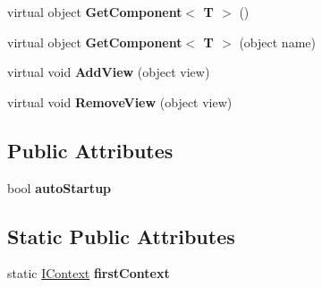 \begin{DoxyCompactItemize}
\item 
\hypertarget{classbabel_1_1extensions_1_1context_1_1impl_1_1_context_a949b909124a55e8e7b889cb94a343653}{virtual object {\bfseries Get\-Component$<$ T $>$} ()}\label{classbabel_1_1extensions_1_1context_1_1impl_1_1_context_a949b909124a55e8e7b889cb94a343653}

\item 
\hypertarget{classbabel_1_1extensions_1_1context_1_1impl_1_1_context_aad6ba901a97aade956c88030e1da2af3}{virtual object {\bfseries Get\-Component$<$ T $>$} (object name)}\label{classbabel_1_1extensions_1_1context_1_1impl_1_1_context_aad6ba901a97aade956c88030e1da2af3}

\item 
\hypertarget{classbabel_1_1extensions_1_1context_1_1impl_1_1_context_a4271a9769c16e83c882e2cafa7b508eb}{virtual void {\bfseries Add\-View} (object view)}\label{classbabel_1_1extensions_1_1context_1_1impl_1_1_context_a4271a9769c16e83c882e2cafa7b508eb}

\item 
\hypertarget{classbabel_1_1extensions_1_1context_1_1impl_1_1_context_af7d05c8aafe412b24a41f2151dd7606f}{virtual void {\bfseries Remove\-View} (object view)}\label{classbabel_1_1extensions_1_1context_1_1impl_1_1_context_af7d05c8aafe412b24a41f2151dd7606f}

\end{DoxyCompactItemize}
\subsection*{Public Attributes}
\begin{DoxyCompactItemize}
\item 
\hypertarget{classbabel_1_1extensions_1_1context_1_1impl_1_1_context_ac2f52b053135d8130bf15435955a8673}{bool {\bfseries auto\-Startup}}\label{classbabel_1_1extensions_1_1context_1_1impl_1_1_context_ac2f52b053135d8130bf15435955a8673}

\end{DoxyCompactItemize}
\subsection*{Static Public Attributes}
\begin{DoxyCompactItemize}
\item 
\hypertarget{classbabel_1_1extensions_1_1context_1_1impl_1_1_context_ad0ee16357196da73dad4459590f37f6f}{static \hyperlink{interfacebabel_1_1extensions_1_1context_1_1api_1_1_i_context}{I\-Context} {\bfseries first\-Context}}\label{classbabel_1_1extensions_1_1context_1_1impl_1_1_context_ad0ee16357196da73dad4459590f37f6f}

\end{DoxyCompactItemize}
